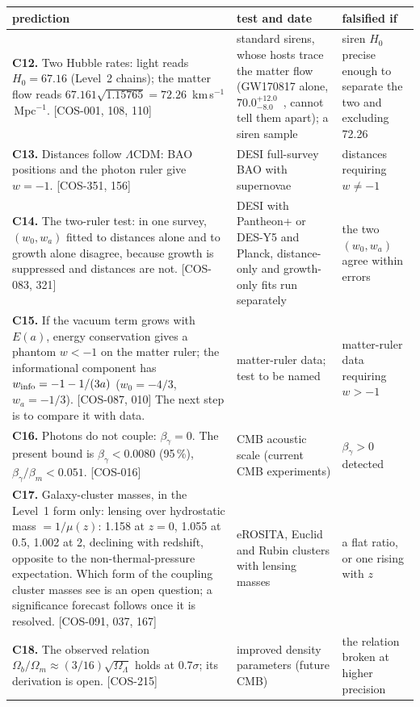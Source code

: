 {\small\begin{longtable}{@{}>{\raggedright\arraybackslash}p{}>{\raggedright\arraybackslash}p{}>{\raggedright\arraybackslash}p{}@{}}
\toprule
prediction & test and date & falsified if \\\midrule\endhead
\textbf{C12.} \Spending{} Two Hubble rates: light reads $H_0=67.16$ (Level~2 chains); the matter flow reads $67.161\sqrt{1.15765}=72.26$~km\,s$^{-1}$\,Mpc$^{-1}$.
 [COS-001, 108, 110]
 & standard sirens, whose hosts trace the matter flow (GW170817 alone, $70.0^{+12.0}_{-8.0}$~\cite{Abbott2017Siren}, cannot tell them apart); a siren sample
 & siren $H_0$ precise enough to separate the two and excluding 72.26 \\ \cmidrule{1-3}
\textbf{C13.} \Spending{} Distances follow $\Lambda$CDM: BAO positions and the photon ruler give $w=-1$. [COS-351, 156]
 & DESI full-survey BAO with supernovae
 & distances requiring $w\ne-1$ \\ \cmidrule{1-3}
\textbf{C14.} \Spending{} The two-ruler test: in one survey, $(w_0,w_a)$ fitted to distances alone and to growth alone disagree, because growth is suppressed
 and distances are not. [COS-083, 321]
 & DESI with Pantheon+ or DES-Y5 and Planck, distance-only and growth-only fits run separately
 & the two $(w_0,w_a)$ agree within errors \\ \cmidrule{1-3}
\textbf{C15.} \Spending{} If the vacuum term grows with $E(a)$, energy conservation gives a phantom $w<-1$ on the matter ruler; the informational component has
 $w_{\rm info}=-1-1/(3a)$ ($w_0=-4/3$, $w_a=-1/3$). [COS-087, 010] \openprob{} The next step is to compare it with data.
 & matter-ruler data; test to be named
 & matter-ruler data requiring $w>-1$ \\ \cmidrule{1-3}
\textbf{C16.} \Spassed{} Photons do not couple: $\beta_\gamma=0$. The present bound is $\beta_\gamma<0.0080$ (95\,\%), $\beta_\gamma/\beta_m<0.051$. [COS-016]
 & CMB acoustic scale (current CMB experiments)
 & $\beta_\gamma>0$ detected \\ \cmidrule{1-3}
\textbf{C17.} \Spending{} Galaxy-cluster masses, in the Level~1 form only: lensing over hydrostatic mass $=1/\mu(z)$: 1.158 at $z=0$, 1.055 at 0.5, 1.002 at 2,
 declining with redshift, opposite to the non-thermal-pressure expectation. Which form of the coupling cluster masses see is an open question; a significance forecast follows once it is resolved. \openprob{} [COS-091, 037, 167]
 & eROSITA, Euclid and Rubin clusters with lensing masses
 & a flat ratio, or one rising with $z$ \\ \cmidrule{1-3}
\textbf{C18.} \Sprecision{} The observed relation $\Omega_b/\Omega_m\approx(3/16)\sqrt{\Omega_\Lambda}$ holds at $0.7\sigma$; its derivation is open. [COS-215]
 & improved density parameters (future CMB)
 & the relation broken at higher precision \\
\bottomrule
\end{longtable}}

